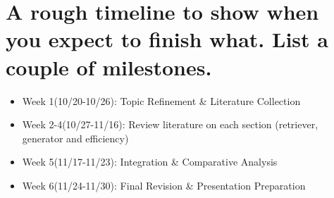 \documentclass[11pt]{article}
\begin{document}
\section{A rough timeline to show when you expect to finish what. List a couple of milestones.}
\begin{itemize}
  \item Week 1(10/20-10/26): Topic Refinement \& Literature Collection
  \item Week 2-4(10/27-11/16): Review literature on each section (retriever, generator and efficiency)
  \item Week 5(11/17-11/23): Integration \& Comparative Analysis
  \item Week 6(11/24-11/30): Final Revision \& Presentation Preparation
\end{itemize}
\end{document}
